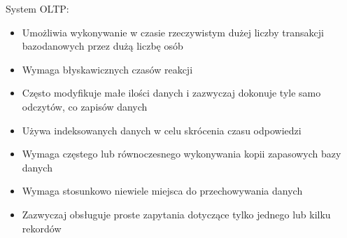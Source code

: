 \documentclass[a4paper,12pt,oneside]{book}
\begin{document}
		System OLTP:
		\begin{itemize}
			\itemsep 0em
			\item Umożliwia wykonywanie w czasie rzeczywistym dużej liczby transakcji bazodanowych przez dużą liczbę osób
			\item Wymaga błyskawicznych czasów reakcji
			\item Często modyfikuje małe ilości danych i zazwyczaj dokonuje tyle samo odczytów, co zapisów danych
			\item Używa indeksowanych danych w celu skrócenia czasu odpowiedzi
			\item Wymaga częstego lub równoczesnego wykonywania kopii zapasowych bazy danych
			\item Wymaga stosunkowo niewiele miejsca do przechowywania danych
			\item Zazwyczaj obsługuje proste zapytania dotyczące tylko jednego lub kilku rekordów
		\end{itemize}
		
\end{document}
